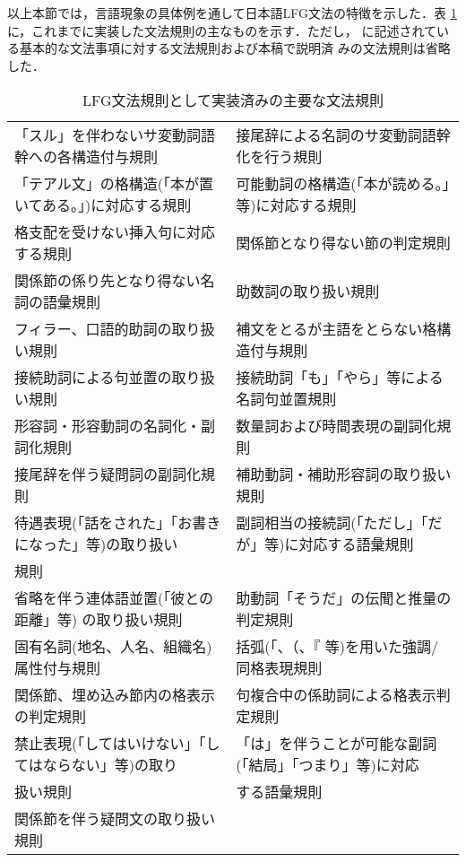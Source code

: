 以上本節では，言語現象の具体例を通して日本語LFG文法の特徴を示した．表
\ref{table1}に，これまでに実装した文法規則の主なものを示す．ただし，\cite{B1999a}
に記述されている基本的な文法事項に対する文法規則および本稿で説明済
みの文法規則は省略した．
\begin{table}[htpb]
\caption{LFG文法規則として実装済みの主要な文法規則}
\begin{tabular}{ll}
\hline
\scriptsize
「スル」を伴わないサ変動詞語幹への各構造付与規則&
\scriptsize
接尾辞による名詞のサ変動詞語幹化を行う規則\\
\scriptsize
「テアル文」の格構造(「本が置いてある。」)に対応する規則&
\scriptsize
可能動詞の格構造(「本が読める。」等)に対応する規則\\
\scriptsize
格支配を受けない挿入句に対応する規則&
\scriptsize
関係節となり得ない節の判定規則\\
\scriptsize
関係節の係り先となり得ない名詞の語彙規則&
\scriptsize
助数詞の取り扱い規則\\
\scriptsize
フィラー、口語的助詞の取り扱い規則&
\scriptsize
補文をとるが主語をとらない格構造付与規則\\
\scriptsize
接続助詞による句並置の取り扱い規則&
\scriptsize
接続助詞「も」「やら」等による名詞句並置規則\\
\scriptsize
形容詞・形容動詞の名詞化・副詞化規則&
\scriptsize
数量詞および時間表現の副詞化規則\\
\scriptsize
接尾辞を伴う疑問詞の副詞化規則&
\scriptsize
補助動詞・補助形容詞の取り扱い規則\\
\scriptsize
待遇表現(「話をされた」「お書きになった」等)の取り扱い&
\vspace{-2mm}
\scriptsize
副詞相当の接続詞(「ただし」「だが」等)に対応する語彙規則\\
\scriptsize
規則&\\
\scriptsize
省略を伴う連体語並置(「彼との距離」等) の取り扱い規則&
\scriptsize
助動詞「そうだ」の伝聞と推量の判定規則\\
\scriptsize
固有名詞(地名、人名、組織名)属性付与規則&
\scriptsize
括弧(「、（、『 等)を用いた強調/同格表現規則\\
\scriptsize
関係節、埋め込み節内の格表示の判定規則&
\scriptsize 句複合中の係助詞による格表示判定規則\\
\scriptsize 禁止表現(「してはいけない」「してはならない」等)の取り&
\scriptsize「は」を伴うことが可能な副詞(「結局」「つまり」等)に対応\\
\scriptsize 扱い規則& 
\scriptsize する語彙規則\\
\scriptsize 関係節を伴う疑問文の取り扱い規則&\\
\hline
\end{tabular}
\vspace{2mm}
\label{table1}
\end{table}
\normalsize



